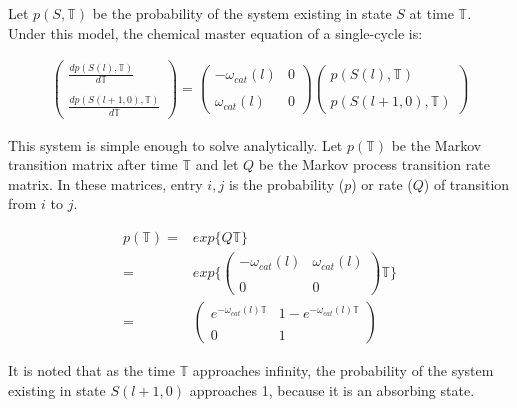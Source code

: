 \documentclass[10pt,letterpaper]{article}
\begin{document}
Let $p(S, \mathbb{T})$ be the probability of the system existing in state $S$ at time $\mathbb{T}$. Under this model, the chemical master equation of a single-cycle is:


\begin{eqnarray}
    \begin{pmatrix}
        \frac{d p( S(l), \mathbb{T} )}{d\mathbb{T}} \\ \\
        \frac{d p( S(l+1,0), \mathbb{T} )}{d\mathbb{T}}
    \end{pmatrix} =
    \begin{pmatrix}
        -\omega_{cat}(l) & 0 \\ \\
        \omega_{cat}(l) & 0
    \end{pmatrix}
    \begin{pmatrix}
        p( S(l), \mathbb{T} ) \\ \\
        p( S(l+1,0), \mathbb{T} )
    \end{pmatrix}
\end{eqnarray}



This system is simple enough to solve analytically. Let $p(\mathbb{T})$ be the Markov transition matrix after time $\mathbb{T}$ and let $Q$ be the Markov process transition rate matrix. In these matrices, entry $i,j$ is the probability ($p$) or rate ($Q$) of transition from $i$ to $j$.


\begin{align}
    p(\mathbb{T}) =& exp\{ Q\mathbb{T} \} \\
    =& exp \Bigg\{
     \begin{pmatrix}
        -\omega_{cat}(l) & \omega_{cat}(l) \\ \\
        0 & 0
    \end{pmatrix} \mathbb{T}
    \Bigg\} \\
    =& \begin{pmatrix}
        e^{-\omega_{cat}(l) \mathbb{T}} & 1 - e^{-\omega_{cat}(l) \mathbb{T}} \\ \\
        0 & 1
    \end{pmatrix}
\end{align}


It is noted that as the time $\mathbb{T}$ approaches infinity, the probability of the system existing in state $S(l+1,0)$ approaches 1, because it is an absorbing state.
\end{document}

